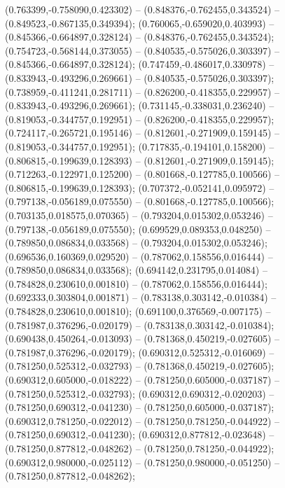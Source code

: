  (0.763399,-0.758090,0.423302) -- (0.848376,-0.762455,0.343524) -- (0.849523,-0.867135,0.349394);
 (0.760065,-0.659020,0.403993) -- (0.845366,-0.664897,0.328124) -- (0.848376,-0.762455,0.343524);
 (0.754723,-0.568144,0.373055) -- (0.840535,-0.575026,0.303397) -- (0.845366,-0.664897,0.328124);
 (0.747459,-0.486017,0.330978) -- (0.833943,-0.493296,0.269661) -- (0.840535,-0.575026,0.303397);
 (0.738959,-0.411241,0.281711) -- (0.826200,-0.418355,0.229957) -- (0.833943,-0.493296,0.269661);
 (0.731145,-0.338031,0.236240) -- (0.819053,-0.344757,0.192951) -- (0.826200,-0.418355,0.229957);
 (0.724117,-0.265721,0.195146) -- (0.812601,-0.271909,0.159145) -- (0.819053,-0.344757,0.192951);
 (0.717835,-0.194101,0.158200) -- (0.806815,-0.199639,0.128393) -- (0.812601,-0.271909,0.159145);
 (0.712263,-0.122971,0.125200) -- (0.801668,-0.127785,0.100566) -- (0.806815,-0.199639,0.128393);
 (0.707372,-0.052141,0.095972) -- (0.797138,-0.056189,0.075550) -- (0.801668,-0.127785,0.100566);
 (0.703135,0.018575,0.070365) -- (0.793204,0.015302,0.053246) -- (0.797138,-0.056189,0.075550);
 (0.699529,0.089353,0.048250) -- (0.789850,0.086834,0.033568) -- (0.793204,0.015302,0.053246);
 (0.696536,0.160369,0.029520) -- (0.787062,0.158556,0.016444) -- (0.789850,0.086834,0.033568);
 (0.694142,0.231795,0.014084) -- (0.784828,0.230610,0.001810) -- (0.787062,0.158556,0.016444);
 (0.692333,0.303804,0.001871) -- (0.783138,0.303142,-0.010384) -- (0.784828,0.230610,0.001810);
 (0.691100,0.376569,-0.007175) -- (0.781987,0.376296,-0.020179) -- (0.783138,0.303142,-0.010384);
 (0.690438,0.450264,-0.013093) -- (0.781368,0.450219,-0.027605) -- (0.781987,0.376296,-0.020179);
 (0.690312,0.525312,-0.016069) -- (0.781250,0.525312,-0.032793) -- (0.781368,0.450219,-0.027605);
 (0.690312,0.605000,-0.018222) -- (0.781250,0.605000,-0.037187) -- (0.781250,0.525312,-0.032793);
 (0.690312,0.690312,-0.020203) -- (0.781250,0.690312,-0.041230) -- (0.781250,0.605000,-0.037187);
 (0.690312,0.781250,-0.022012) -- (0.781250,0.781250,-0.044922) -- (0.781250,0.690312,-0.041230);
 (0.690312,0.877812,-0.023648) -- (0.781250,0.877812,-0.048262) -- (0.781250,0.781250,-0.044922);
 (0.690312,0.980000,-0.025112) -- (0.781250,0.980000,-0.051250) -- (0.781250,0.877812,-0.048262);
